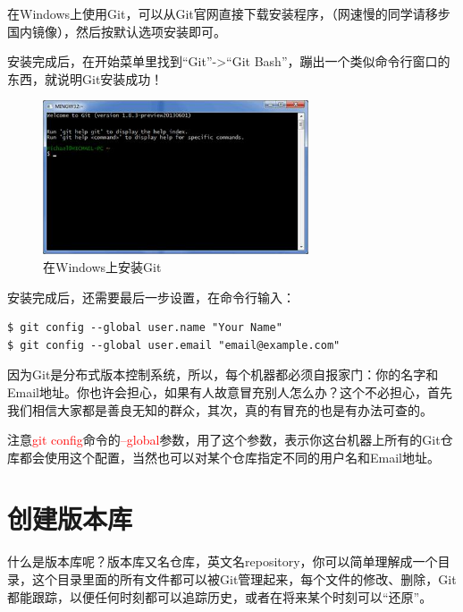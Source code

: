 在Windows上使用Git，可以从Git官网直接下载安装程序，（网速慢的同学请移步国内镜像），然后按默认选项安装即可。

安装完成后，在开始菜单里找到“Git”->“Git Bash”，蹦出一个类似命令行窗口的东西，就说明Git安装成功！

\begin{figure}[h]
    \centering
    \includegraphics[width=0.7\textwidth]{img/install-git-on-windows.jpg}
    \caption{在Windows上安装Git}
    \label{fig:mesh1}
\end{figure}


安装完成后，还需要最后一步设置，在命令行输入：

\begin{verbatim}
$ git config --global user.name "Your Name"
$ git config --global user.email "email@example.com"
\end{verbatim}

因为Git是分布式版本控制系统，所以，每个机器都必须自报家门：你的名字和Email地址。你也许会担心，如果有人故意冒充别人怎么办？这个不必担心，首先我们相信大家都是善良无知的群众，其次，真的有冒充的也是有办法可查的。

注意\textcolor{red}{git config}命令的\textcolor{red}{--global}参数，用了这个参数，表示你这台机器上所有的Git仓库都会使用这个配置，当然也可以对某个仓库指定不同的用户名和Email地址。

\chapter{创建版本库}

什么是版本库呢？版本库又名仓库，英文名repository，你可以简单理解成一个目录，这个目录里面的所有文件都可以被Git管理起来，每个文件的修改、删除，Git都能跟踪，以便任何时刻都可以追踪历史，或者在将来某个时刻可以“还原”。

